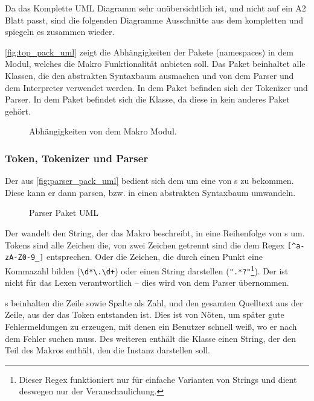     Da das Komplette UML Diagramm sehr unübersichtlich ist, und nicht auf ein A2 Blatt passt, sind die folgenden Diagramme Ausschnitte aus dem kompletten und spiegeln es zusammen wieder.

    \autoref{fig:top_pack_uml} zeigt die Abhängigkeiten der Pakete (namespaces) in dem Modul, welches die Makro Funktionalität anbieten soll. Das  Paket beinhaltet alle Klassen, die den abstrakten Syntaxbaum ausmachen und von dem Parser und dem Interpreter verwendet werden. In dem  Paket befinden sich der Tokenizer und Parser. In dem  Paket befindet sich die  Klasse, da diese in kein anderes Paket gehört.
    \begin{figure}[H]
      \centering
      \caption{Abhängigkeiten von dem Makro Modul.}
      \label{fig:top_pack_uml}
    \end{figure}

    \subsubsection{Token, Tokenizer und Parser}
    \label{sssec:Token, Tokenizer und Parser}
      Der  aus \autoref{fig:parser_pack_uml} bedient sich dem  um eine  von s zu bekommen. Diese  kann er dann parsen, bzw. in einen abstrakten Syntaxbaum umwandeln.
      \begin{figure}[H]
        \centering
        \caption{Parser Paket UML}
        \label{fig:parser_pack_uml}
      \end{figure}

      Der  wandelt den String, der das Makro beschreibt, in eine Reihenfolge von s um. Tokens sind alle Zeichen die, von zwei Zeichen getrennt sind die dem Regex \lstinline$[^a-zA-Z0-9_]$ entsprechen. Oder die Zeichen, die durch einen Punkt eine
      Kommazahl bilden (\lstinline$\d*\.\d+$) oder einen String darstellen (\lstinline$".*?"$\footnote{
        Dieser Regex funktioniert nur für einfache Varianten von Strings und dient deswegen nur der Veranschaulichung.
      }). Der  ist nicht für das Lexen verantwortlich -- dies wird von dem Parser übernommen.

      s beinhalten die Zeile sowie Spalte als Zahl, und den gesamten Quelltext aus der Zeile, aus der das Token entstanden ist. Dies ist von Nöten, um später gute Fehlermeldungen zu erzeugen, mit denen ein Benutzer schnell weiß, wo er nach dem Fehler suchen muss. Des weiteren enthält die Klasse einen String, der den Teil des Makros enthält, den die Instanz darstellen soll.

